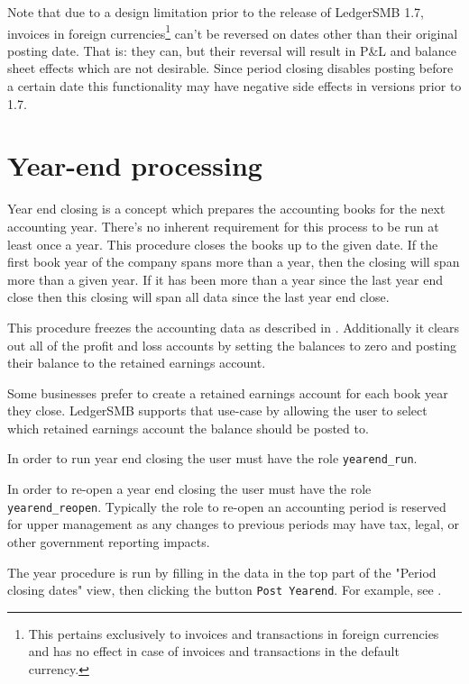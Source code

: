 Note that due to a design limitation prior to the release of LedgerSMB 1.7, 
invoices in foreign currencies\footnote{This pertains exclusively
	to invoices and transactions in foreign
	currencies and has no effect in case of invoices and transactions in the default
	currency.} can't be reversed on dates
other than their original posting date. That is: they can, but their
reversal will result in P\&L and balance sheet effects which are not desirable. 
Since period closing disables posting before a certain date this
functionality may have negative side effects in versions prior to 1.7.


\section{Year-end processing}
\label{sec-business-processes-accounting-year-end-processing}

Year end closing is a concept which prepares the accounting books for the next
\gls{accounting year}. There's
no inherent requirement for this process to be run at least once a year. 
This procedure closes the books up to the given date. 
If the first book year of the company spans more than a year, 
then the closing will span more than a given year.
If it has been more than a year since the last year end close then
this closing will span all data since the last year end close.

This procedure freezes the accounting data as described in . Additionally it clears out all of the profit and loss accounts by
setting the balances to zero and posting their balance to the retained earnings account. 

Some businesses prefer to create a retained earnings account for each book year they
close. LedgerSMB supports that use-case by allowing the user to select which
retained earnings account the balance should be posted to.

In order to run year end closing the user must have the role  \texttt{yearend\_run}. 

In order to re-open a year end closing the user must have the role \texttt{yearend\_reopen}.
Typically the role to re-open an accounting period is reserved for upper management as any changes to previous periods may have tax, legal, or other government reporting impacts.

The year procedure is run by filling in the data in the top part of the "Period closing dates" view, then clicking the button \texttt{Post Yearend}. For example, see .


